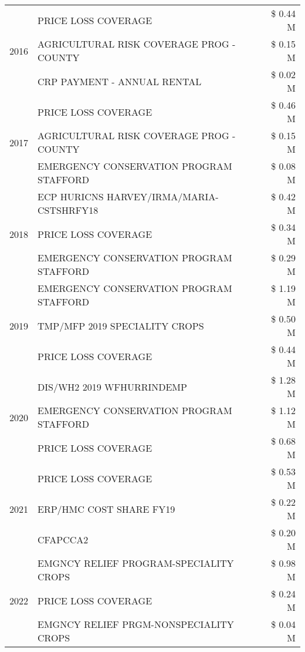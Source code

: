 \begin{tabular}{llr}
\cline{1-3}
\multirow[t]{3}{*}{2016} & PRICE LOSS COVERAGE & \$ 0.44 M \\
 & AGRICULTURAL RISK COVERAGE PROG - COUNTY & \$ 0.15 M \\
 & CRP PAYMENT - ANNUAL RENTAL & \$ 0.02 M \\
\cline{1-3}
\multirow[t]{3}{*}{2017} & PRICE LOSS COVERAGE & \$ 0.46 M \\
 & AGRICULTURAL RISK COVERAGE PROG - COUNTY & \$ 0.15 M \\
 & EMERGENCY CONSERVATION PROGRAM STAFFORD & \$ 0.08 M \\
\cline{1-3}
\multirow[t]{3}{*}{2018} & ECP HURICNS HARVEY/IRMA/MARIA-CSTSHRFY18 & \$ 0.42 M \\
 & PRICE LOSS COVERAGE & \$ 0.34 M \\
 & EMERGENCY CONSERVATION PROGRAM STAFFORD & \$ 0.29 M \\
\cline{1-3}
\multirow[t]{3}{*}{2019} & EMERGENCY CONSERVATION PROGRAM STAFFORD & \$ 1.19 M \\
 & TMP/MFP 2019 SPECIALITY CROPS & \$ 0.50 M \\
 & PRICE LOSS COVERAGE & \$ 0.44 M \\
\cline{1-3}
\multirow[t]{3}{*}{2020} & DIS/WH2 2019 WFHURRINDEMP & \$ 1.28 M \\
 & EMERGENCY CONSERVATION PROGRAM STAFFORD & \$ 1.12 M \\
 & PRICE LOSS COVERAGE & \$ 0.68 M \\
\cline{1-3}
\multirow[t]{3}{*}{2021} & PRICE LOSS COVERAGE & \$ 0.53 M \\
 & ERP/HMC COST SHARE FY19 & \$ 0.22 M \\
 & CFAPCCA2 & \$ 0.20 M \\
\cline{1-3}
\multirow[t]{3}{*}{2022} & EMGNCY RELIEF PROGRAM-SPECIALITY CROPS & \$ 0.98 M \\
 & PRICE LOSS COVERAGE & \$ 0.24 M \\
 & EMGNCY RELIEF PRGM-NONSPECIALITY CROPS & \$ 0.04 M \\
\cline{1-3}
\bottomrule
\end{tabular}
